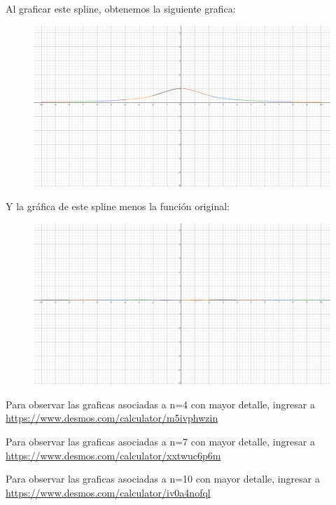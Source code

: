 Al graficar este spline, obtenemos la siguiente grafica:
\begin{figure}[H]
	\centering
	\includegraphics[scale=0.2]{img/2_10.png}
\end{figure}
Y la gráfica de este spline menos la función original:
\begin{figure}[H]
	\centering
	\includegraphics[scale=0.2]{img/2_10dif.png}
\end{figure}

Para observar las graficas asociadas a n=4 con mayor detalle, ingresar a \url{https://www.desmos.com/calculator/m5ivphwzin}

Para observar las graficas asociadas a n=7 con mayor detalle, ingresar a \url{https://www.desmos.com/calculator/xxtwuc6p6m}

Para observar las graficas asociadas a n=10 con mayor detalle, ingresar a \url{https://www.desmos.com/calculator/iv0a4nofql}